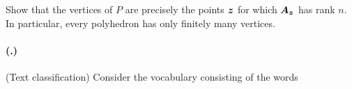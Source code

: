 \documentclass{article}
\newcounter{problemSheetNumber}
\newcounter{problems}
\renewcommand{\problem}{\paragraph{(\theproblemSheetNumber.\theproblems)}\addtocounter{problems}{1}}
\begin{document}
Show that the vertices of $P$ are precisely the points $\bm{z}$ for which $\bm{A}_{\bm{z}}$ has rank $n$. In particular, every polyhedron has only finitely many vertices.

\problem (Text classification) Consider the vocabulary consisting of the words
\end{document}
